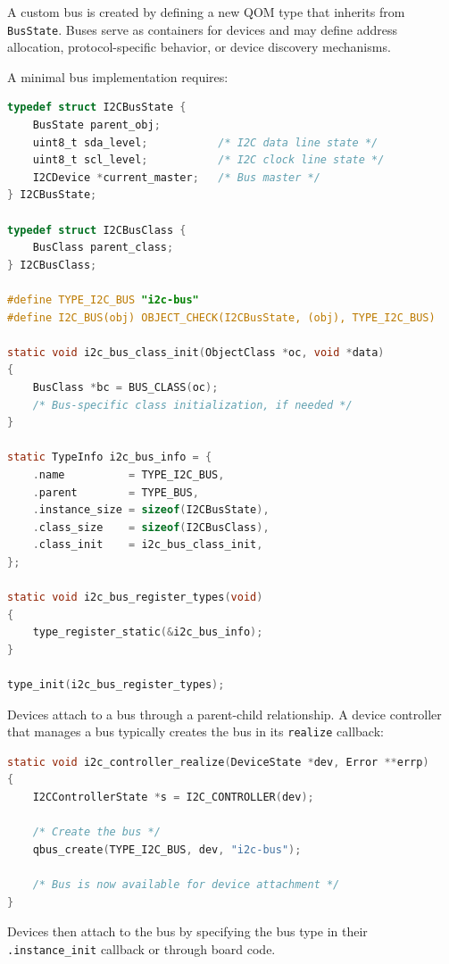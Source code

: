 A custom bus is created by defining a new QOM type that inherits from \texttt{BusState}. Buses serve as containers for devices and may define address allocation, protocol-specific behavior, or device discovery mechanisms.

A minimal bus implementation requires:

\begin{lstlisting}[language=C, style=small, caption=Custom bus implementation]
typedef struct I2CBusState {
    BusState parent_obj;
    uint8_t sda_level;           /* I2C data line state */
    uint8_t scl_level;           /* I2C clock line state */
    I2CDevice *current_master;   /* Bus master */
} I2CBusState;

typedef struct I2CBusClass {
    BusClass parent_class;
} I2CBusClass;

#define TYPE_I2C_BUS "i2c-bus"
#define I2C_BUS(obj) OBJECT_CHECK(I2CBusState, (obj), TYPE_I2C_BUS)

static void i2c_bus_class_init(ObjectClass *oc, void *data)
{
    BusClass *bc = BUS_CLASS(oc);
    /* Bus-specific class initialization, if needed */
}

static TypeInfo i2c_bus_info = {
    .name          = TYPE_I2C_BUS,
    .parent        = TYPE_BUS,
    .instance_size = sizeof(I2CBusState),
    .class_size    = sizeof(I2CBusClass),
    .class_init    = i2c_bus_class_init,
};

static void i2c_bus_register_types(void)
{
    type_register_static(&i2c_bus_info);
}

type_init(i2c_bus_register_types);
\end{lstlisting}

Devices attach to a bus through a parent-child relationship. A device controller that manages a bus typically creates the bus in its \texttt{realize} callback:

\begin{lstlisting}[language=C, style=small, caption=Creating and exposing a bus from a device]
static void i2c_controller_realize(DeviceState *dev, Error **errp)
{
    I2CControllerState *s = I2C_CONTROLLER(dev);
    
    /* Create the bus */
    qbus_create(TYPE_I2C_BUS, dev, "i2c-bus");
    
    /* Bus is now available for device attachment */
}
\end{lstlisting}

Devices then attach to the bus by specifying the bus type in their \texttt{.instance\_init} callback or through board code.

